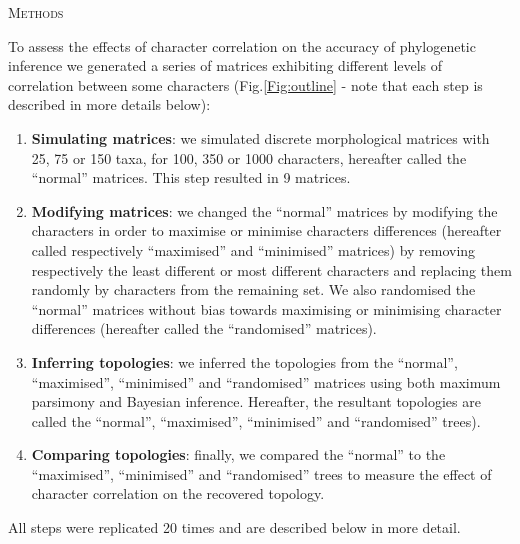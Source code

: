 \documentclass[12pt,letterpaper]{article}
\renewcommand{\section}[1]{%
\bigskip
\begin{center}
\begin{Large}
\normalfont\scshape #1
\medskip
\end{Large}
\end{center}}
\begin{document}
\section{Methods}
To assess the effects of character correlation on the accuracy of phylogenetic inference we generated a series of matrices exhibiting different levels of correlation between some characters (Fig.\ref{Fig:outline} - note that each step is described in more details below): %
\begin{enumerate}
    \item \textbf{Simulating matrices}: we simulated discrete morphological matrices with 25, 75 or 150 taxa, for 100, 350 or 1000 characters, hereafter called the ``normal'' matrices. This step resulted in 9 matrices.

    \item \textbf{Modifying matrices}: we changed the ``normal'' matrices by modifying the characters in order to maximise or minimise characters differences (hereafter called respectively ``maximised'' and ``minimised'' matrices) by removing respectively the least different or most different characters and replacing them randomly by characters from the remaining set.
    We also randomised the ``normal'' matrices without bias towards maximising or minimising character differences (hereafter called the ``randomised'' matrices).

    \item \textbf{Inferring topologies}: we inferred the topologies from the ``normal'', ``maximised'', ``minimised'' and ``randomised'' matrices using both maximum parsimony and Bayesian inference.
    Hereafter, the resultant topologies are called the ``normal'', ``maximised'', ``minimised'' and ``randomised'' trees).

    \item \textbf{Comparing topologies}: finally, we compared the ``normal'' to the ``maximised'', ``minimised'' and ``randomised'' trees to measure the effect of character correlation on the recovered topology.

\end{enumerate}
All steps were replicated 20 times and are described below in more detail.
\end{document}
